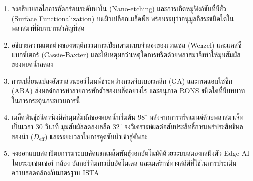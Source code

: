 \begin{enumerate}
    \item จงอธิบายกลไกการกัดกร่อนระดับนาโน (Nano-etching) และการเกิดหมู่ฟังก์ชันที่มีขั้ว (Surface Functionalization) บนผิวเปลือกเมล็ดพืช พร้อมระบุว่าอนุมูลอิสระชนิดใดในพลาสมาที่มีบทบาทสำคัญที่สุด
    \item อธิบายความแตกต่างของพฤติกรรมการเปียกตามแบบจำลองของเวนเซล (Wenzel) และแคสซี-แบกซ์เตอร์ (Cassie-Baxter) และให้เหตุผลว่าเหตุใดการทรีตด้วยพลาสมาจึงทำให้มุมสัมผัสของหยดน้ำลดลง
    \item การเปลี่ยนแปลงอัตราส่วนฮอร์โมนพืชระหว่างกรดจิบเบอเรลลิก (GA) และกรดแอบไซซิก (ABA) ส่งผลต่อการทำลายการพักตัวของเมล็ดอย่างไร และอนุภาค RONS ชนิดใดที่มีบทบาทในการกระตุ้นกระบวนการนี้
    \item เมล็ดพันธุ์ชนิดหนึ่งมีค่ามุมสัมผัสของหยดน้ำเริ่มต้น $98^\circ$ หลังจากการทรีตเมนต์ด้วยพลาสมาเจ็ทเป็นเวลา 30 วินาที มุมสัมผัสลดลงเหลือ $32^\circ$ จงวิเคราะห์ผลต่อสัมประสิทธิ์การแพร่ประสิทธิผลของน้ำ ($D_{\text{eff}}$) และระยะเวลาในการดูดซับน้ำเข้าสู่คัพภะ
    \item จงออกแบบสถาปัตยกรรมระบบคัดแยกเมล็ดพันธุ์งอกอัตโนมัติด้วยระบบสมองกลฝังตัว Edge AI โดยระบุเซนเซอร์ กล้อง อัลกอริทึมการบีบอัดโมเดล และเมตริกซ์ทางสถิติที่ใช้ในการประเมินความสอดคล้องกับมาตรฐาน ISTA
\end{enumerate}
